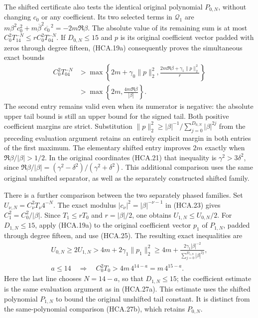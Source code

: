 The shifted certificate also tests the identical original polynomial
$P_{0,N}$, without changing $c_0$ or any coefficient. Its two selected
terms in $\mathcal Q_1$ are
$m\beta^2c_0^2+m\overline\beta^2\overline{c_0}^{\,2}
=-2m\Re\beta$. The absolute value of its remaining sum is at
most $C_0^2T_14^{-N}\leq rC_0^2T_04^{-N}$. If
$D_{0,N}\leq15$ and $p$ is its original coefficient vector padded
with zeros through degree fifteen, (HCA.19a) consequently proves
the simultaneous exact bounds
\[
 \begin{aligned}
 C_0^2T_04^{-N}
 &>\max\left\{2m+\gamma_0\|p\|_2^2,
          \frac{2m\Re\beta+\gamma_1\|p\|_2^2}{r}\right\}\\
 &>\max\left\{2m,\frac{4m\Re\beta}{|\beta|}\right\}.
 \end{aligned}
 \tag{HCA.27b}
\]
The second entry remains valid even when its numerator is negative:
the absolute upper tail bound is still an upper bound for the signed
tail. Both positive coefficient margins are strict. Substitution
$\|p\|_2^2\geq|\beta|^{-1}/\sum_{j=0}^{D_{0,N}}|\beta|^{2j}$
from the preceding evaluation argument retains an entirely explicit
margin in both entries of the first maximum. The elementary shifted
entry improves $2m$ exactly when $\Re\beta/|\beta|>1/2$.
In the original coordinates (HCA.21) that inequality is
$\gamma^2>3\delta^2$, since
$\Re\beta/|\beta|=(\gamma^2-\delta^2)/(\gamma^2+\delta^2)$.
This additional comparison uses the same original unshifted
separator, as well as the separately constructed shifted family.

There is a further comparison between the two separately phased
families. Set $U_{\nu,N}=C_\nu^2T_\nu4^{-N}$. The exact modulus
$|c_\nu|^2=|\beta|^{-\nu-1}$ in (HCA.23) gives
$C_1^2=C_0^2/|\beta|$. Since $T_1\leq rT_0$ and
$r=|\beta|/2$, one obtains $U_{1,N}\leq U_{0,N}/2$.
For $D_{1,N}\leq15$, apply (HCA.19a) to the original coefficient
vector $p_1$ of $P_{1,N}$, padded through degree fifteen, and use
(HCA.25). The resulting exact inequalities are
\[
 \begin{gathered}
 U_{0,N}\geq2U_{1,N}
 >4m+2\gamma_1\|p_1\|_2^2
 \geq4m+
       \frac{2\gamma_1|\beta|^{-2}}
            {\sum_{j=0}^{D_{1,N}}|\beta|^{2j}},\\
 a\leq14\quad\Longrightarrow\quad
 C_0^2T_0>4m\,4^{14-a}=m\,4^{15-a}.
 \end{gathered}
 \tag{HCA.27c}
\]
Here the last line chooses $N=14-a$, so that $D_{1,N}\leq15$;
the coefficient estimate is the same evaluation argument as in
(HCA.27a). This estimate uses the shifted polynomial $P_{1,N}$
to bound the original unshifted tail constant. It is distinct from
the same-polynomial comparison (HCA.27b), which retains $P_{0,N}$.

